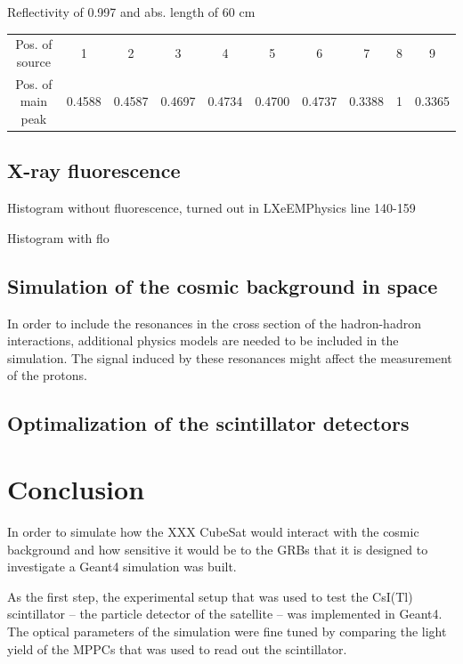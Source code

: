 \documentclass[12pt, a4paper,titlepage]{article}
\numberwithin{equation}{section}
\numberwithin{figure}{section}
\begin{document}
Reflectivity of 0.997 and abs. length of 60 cm

\begin{center}
\begin{tabular}{ |c|c|c|c|c|c|c|c|c|c| } 
 \hline
  Pos. of source & 1 & 2 & 3 & 4 & 5 & 6 & 7 & 8 & 9 \\ 
  Pos. of main peak & 0.4588 & 0.4587 & 0.4697 & 0.4734 & 0.4700 & 0.4737 & 0.3388 & 1 & 0.3365  \\ 
 \hline
\end{tabular}
\end{center}




\subsection{X-ray fluorescence}
Histogram without fluorescence, turned out in LXeEMPhysics line 140-159

Histogram with flo

\subsection{Simulation of the cosmic background in space}

In order to include the resonances in the cross section of the hadron-hadron interactions, additional physics models are needed to be included in the simulation. The signal induced by these resonances might affect the measurement of the protons.
\subsection{Optimalization of the scintillator detectors}

\pagebreak
\section{Conclusion}

In order to simulate how the XXX CubeSat would interact with the cosmic background and how sensitive it would be to the GRBs that it is designed to investigate a Geant4 simulation was built.

As the first step, the experimental setup that was used to test the CsI(Tl) scintillator -- the particle detector of the satellite -- was implemented in Geant4. The optical parameters of the simulation were fine tuned by comparing the light yield of the MPPCs that was used to read out the scintillator.
\end{document}
